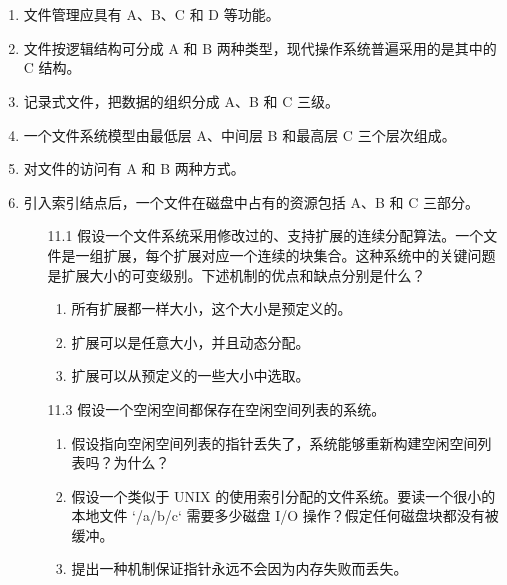 \documentclass[UTF8]{ctexart}
\begin{document}
\section{}
\begin{enumerate}
	\item 文件管理应具有 A、B、C 和 D 等功能。
	
	\item 文件按逻辑结构可分成 A 和 B 两种类型，现代操作系统普遍采用的是其中的 C 结构。
	
	\item 记录式文件，把数据的组织分成 A、B 和 C 三级。
	
	\item 一个文件系统模型由最低层 A、中间层 B 和最高层 C 三个层次组成。
	
	\item 对文件的访问有 A 和 B 两种方式。
	
	\item 引入索引结点后，一个文件在磁盘中占有的资源包括 A、B 和 C 三部分。
	
		
		\begin{enumerate}
			\item[11.1] 假设一个文件系统采用修改过的、支持扩展的连续分配算法。一个文件是一组扩展，每个扩展对应一个连续的块集合。这种系统中的关键问题是扩展大小的可变级别。下述机制的优点和缺点分别是什么？
			\begin{enumerate}
				\item 所有扩展都一样大小，这个大小是预定义的。
				\item 扩展可以是任意大小，并且动态分配。
				\item 扩展可以从预定义的一些大小中选取。
			\end{enumerate}
			
			\item[11.3] 假设一个空闲空间都保存在空闲空间列表的系统。
			\begin{enumerate}
				\item 假设指向空闲空间列表的指针丢失了，系统能够重新构建空闲空间列表吗？为什么？
				\item 假设一个类似于 UNIX 的使用索引分配的文件系统。要读一个很小的本地文件 `/a/b/c` 需要多少磁盘 I/O 操作？假定任何磁盘块都没有被缓冲。
				\item 提出一种机制保证指针永远不会因为内存失败而丢失。
			\end{enumerate}
		\end{enumerate}

\end{enumerate}
\end{document}
